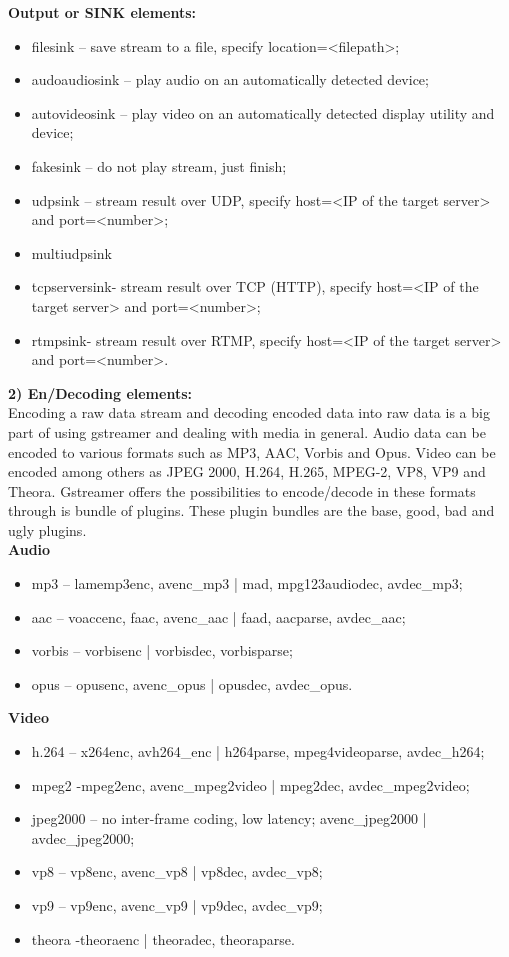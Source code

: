 \textbf{Output or SINK elements:}\\
\begin{itemize}
\item filesink – save stream to a file, specify location=<filepath>;
\item  audoaudiosink – play audio on an automatically detected device;
\item   autovideosink – play video on an automatically detected display utility and device;
\item   fakesink – do not play stream, just finish;
\item  udpsink – stream result over UDP, specify host=<IP of the target server> and port=<number>;
\item   multiudpsink
\item  tcpserversink- stream result over TCP (HTTP), specify host=<IP of the target server> and port=<number>;
\item rtmpsink- stream result over RTMP, specify host=<IP of the target server> and port=<number>.
\end{itemize}


\textbf{2) En/Decoding elements:}\\
Encoding a raw data stream and decoding encoded data into raw data is a big part of using gstreamer and dealing with media in general. Audio data can be encoded to various formats such as MP3, AAC, Vorbis and Opus. Video can be encoded among others as JPEG 2000, H.264, H.265, MPEG-2, VP8, VP9 and Theora. Gstreamer offers the possibilities to encode/decode in these formats through is bundle of plugins. These plugin bundles are the base, good, bad and ugly plugins.
\\


\textbf{Audio}\\
\begin{itemize}
\item mp3 – lamemp3enc, avenc\_mp3 | mad, mpg123audiodec, avdec\_mp3; 
\item  aac – voaccenc, faac, avenc\_aac | faad, aacparse, avdec\_aac;
\item  vorbis – vorbisenc | vorbisdec, vorbisparse;
\item  opus – opusenc, avenc\_opus | opusdec, avdec\_opus.
\end{itemize}


\textbf{Video}\\
\begin{itemize}
\item h.264 – x264enc, avh264\_enc |  h264parse, mpeg4videoparse, avdec\_h264;
\item mpeg2 -mpeg2enc, avenc\_mpeg2video | mpeg2dec, avdec\_mpeg2video;
\item jpeg2000 – no inter-frame coding, low latency; avenc\_jpeg2000 | avdec\_jpeg2000;
\item vp8 – vp8enc, avenc\_vp8 | vp8dec, avdec\_vp8;
\item vp9 – vp9enc, avenc\_vp9 | vp9dec, avdec\_vp9;
\item theora -theoraenc | theoradec, theoraparse.
\end{itemize}


